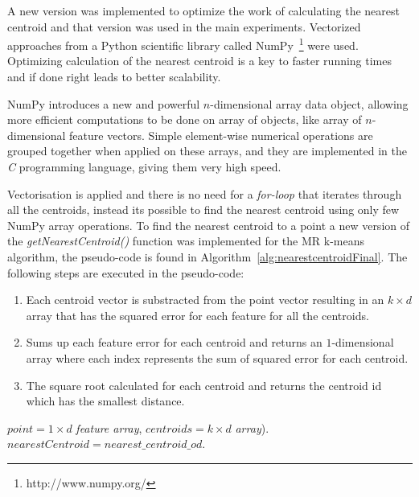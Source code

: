 A new version was implemented to optimize the work of calculating the nearest centroid and that version was used in the main experiments. Vectorized approaches from a Python scientific library called NumPy~\footnote{http://www.numpy.org/} were used. Optimizing calculation of the nearest centroid is a key to faster running times and if done right leads to better scalability.

NumPy introduces a new and powerful $n$-dimensional array data object, allowing more efficient computations to be done on array of objects, like array of $n$-dimensional feature vectors. Simple element-wise numerical operations are grouped together when applied on these arrays, and they are implemented in the \textit{C} programming language, giving them very high speed. 

Vectorisation is applied and there is no need for a \textit{for-loop} that iterates through all the centroids, instead its possible to find the nearest centroid using only few NumPy array operations. To find the nearest centroid to a point a new version of the \textit{getNearestCentroid()} function was implemented for the MR k-means algorithm, the pseudo-code is found in Algorithm~\ref{alg:nearestcentroidFinal}. The following steps are executed in the pseudo-code: 
\begin{enumerate}
\item Each centroid vector is substracted from the point vector resulting in an $k \times d$ array that has the squared error for each feature for all the centroids. 
\item Sums up each feature error for each centroid and returns an $1$-dimensional array where each index represents the sum of squared error for each centroid. 
\item The square root calculated for each centroid and returns the centroid id which has the smallest distance.
\end{enumerate}


\begin{center}
\newcommand{\map}{\ensuremath{\mbox{\sc Final Version: getNearestCentroid}}}
\begin{algorithm}[h!]
\caption{$\map(point, centroids)$}\label{alg:nearestcentroidFinal}
\begin{algorithmic}[1]
\REQUIRE $point = 1 \times d$ \textit{feature array}, $centroids = k \times d$ \textit{array}).
\ENSURE $nearestCentroid = nearest\_centroid\_od$.
\medskip
{}
\medskip
{}
\end{algorithmic}
\end{algorithm}
\end{center}


